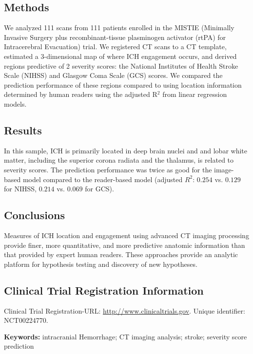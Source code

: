 \documentclass[10pt]{article}\usepackage[]{graphicx}\usepackage[]{color}
\begin{document}
\subsection*{Methods}
We analyzed 111 scans from 111 patients enrolled in the MISTIE (Minimally Invasive Surgery plus recombinant-tissue plasminogen activator (rtPA) for Intracerebral Evacuation) trial.  We registered CT scans to a CT template, estimated a 3-dimensional map of where ICH engagement occurs, and derived regions predictive of 2 severity scores: the National Institutes of Health Stroke Scale (NIHSS) and Glasgow Coma Scale (GCS) scores. We compared the prediction performance of these regions compared to using location information determined by human readers using the adjusted R$^2$ from linear regression models.

\subsection*{Results}
In this sample, ICH is primarily located in deep brain nuclei and and lobar white matter, including the superior corona radiata and the thalamus, is related to severity scores.   The prediction performance was twice as good for the image-based model compared to the reader-based model (adjusted $R^2$: $0.254$ vs. $0.129$ for NIHSS, $0.214$ vs. $0.069$ for GCS). 


\subsection*{Conclusions}
Measures of ICH location and engagement using advanced CT imaging processing provide finer, more quantitative, and more predictive anatomic information than that provided by expert human readers.  These approaches provide an analytic platform for hypothesis testing and discovery of new hypotheses. 

\subsection*{Clinical Trial Registration Information}
Clinical Trial Registration-URL: \url{http://www.clinicaltrials.gov}. Unique identifier: NCT00224770.


{\bf Keywords:} intracranial Hemorrhage; CT imaging analysis; stroke; severity score prediction

\newpage
\end{document}
